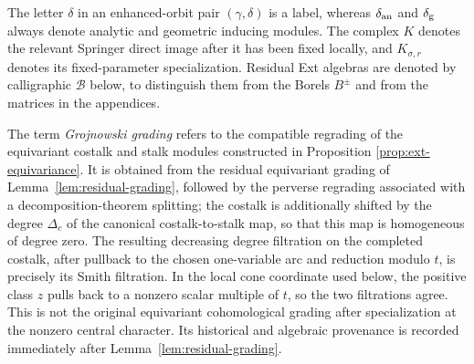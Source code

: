 \documentclass[11pt]{amsart}
\theoremstyle{definition}
\theoremstyle{remark}
\begin{document}
The letter $\delta$ in an enhanced-orbit pair $(\gamma,\delta)$ is a label,
whereas $\delta_{\rm an}$ and $\delta_{\rm g}$ always denote analytic and
geometric inducing modules.  The complex $K$ denotes the relevant Springer
direct image after it has been fixed locally, and $K_{\sigma,r}$ denotes its
fixed-parameter specialization.  Residual Ext algebras are denoted by
calligraphic $\mathcal B$ below, to distinguish them from the Borels
$B^\pm$ and from the matrices in the appendices.

The term \emph{Grojnowski grading} refers to the compatible regrading of the
equivariant costalk and stalk modules constructed in Proposition
\ref{prop:ext-equivariance}.  It is obtained from the residual equivariant
grading of Lemma~\ref{lem:residual-grading}, followed by the perverse
regrading associated with a decomposition-theorem splitting; the costalk is
additionally shifted by the degree $\Delta_c$ of the canonical
costalk-to-stalk map, so that this map is homogeneous of degree zero.  The
resulting decreasing degree filtration on the completed costalk, after
pullback to the chosen one-variable arc and reduction modulo $t$, is
precisely its Smith filtration.  In the local cone coordinate used below,
the positive class $z$ pulls back to a nonzero scalar multiple of $t$, so
the two filtrations agree.  This is not the original equivariant
cohomological grading after specialization at the nonzero central character.
Its historical and algebraic provenance is recorded immediately after
Lemma~\ref{lem:residual-grading}.
\end{document}
